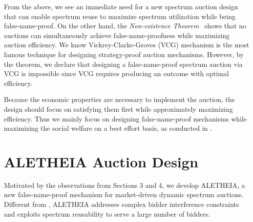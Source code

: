 \documentclass{sig-alternate}
\begin{document}
From the above, we see an immediate need for a new spectrum auction design that can enable spectrum reuse to maximize spectrum utilization while being false-name-proof. On the other hand, the \emph{Non-existence Theorem}~\cite{Yokoo:GEB:04} shows that no auctions can simultaneously achieve false-name-proofness while maximizing auction efficiency.  We know Vickrey-Clarke-Groves (VCG) mechanism \cite{Oxford:book} is the most famous technique for designing strategy-proof auction mechanisms. However, by the theorem, we declare that designing a false-name-proof spectrum auction via VCG is impossible since VCG requires producing an outcome with optimal efficiency.

Because the economic properties are necessary to implement the auction, the design should focus on satisfying them first while approximately maximizing efficiency. Thus we mainly focus on designing false-name-proof mechanisms while maximizing the social welfare on a best effort basis, as conducted in \cite{Yokoo:AI:02, Yokoo:ijcai:01}.


\section{ALETHEIA Auction Design}
Motivated by the observations from Sections 3 and 4, we develop ALETHEIA, a new false-name-proof mechanism for market-driven dynamic spectrum auctions.
Different from \cite{Terada:03:AAMAS,Yokoo:ijcai:01}, ALETHEIA addresses complex bidder interference constraints and exploits spectrum reusability to serve a large number of bidders.

\end{document}

